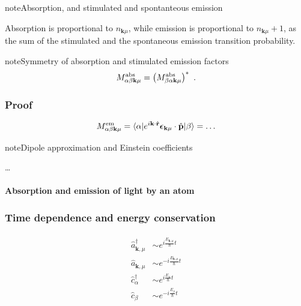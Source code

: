 \documentclass[letterpaper,10pt,english]{jupyterBook}
\begin{document}
\begin{sphinxadmonition}{note}{Absorption, and stimulated and spontanteous emission}

\sphinxAtStartPar
Absorption is proportional to \(n_{\mathbf{k} \mu}\), while emission is proportional to \(n_{\mathbf{k} \mu} + 1\), as the sum of the stimulated and the spontaneous emission transition probability.
\end{sphinxadmonition}

\begin{sphinxadmonition}{note}{Symmetry of absorption and stimulated emission factors}
\begin{equation*}
\begin{split}M^{\rm abs}_{\alpha \beta \mathbf{k} \mu} = \left( M^{\rm abs}_{\beta \alpha \mathbf{k} \mu} \right)^* \ .\end{split}
\end{equation*}\subsubsection*{Proof}
\begin{equation*}
\begin{split}M^{\rm em }_{\alpha \beta \mathbf{k} \mu} = \langle \alpha | e^{i \mathbf{k} \cdot \hat{\mathbf{r}}} \boldsymbol\epsilon_{\mathbf{k}\mu} \cdot \hat{\mathbf{p}} | \beta \rangle = \dots\end{split}
\end{equation*}\end{sphinxadmonition}

\begin{sphinxadmonition}{note}{Dipole approximation and Einstein coefficients}

\sphinxAtStartPar
…
\end{sphinxadmonition}


\paragraph{Absorption and emission of light by an atom}
\label{\detokenize{ch/quantum-mechanics/qft/interactions-e-em-fields-atom-spectrum:absorption-and-emission-of-light-by-an-atom}}\subsubsection*{Time dependence and energy conservation}
\begin{equation*}
\begin{split}\begin{aligned}
 \hat{a}_{\mathbf{k}, \mu}^\dagger & \sim e^{ i \frac{E_{\mathbf{k},\mu}}{\hbar} t} \\
 \hat{a}_{\mathbf{k}, \mu}         & \sim e^{-i \frac{E_{\mathbf{k},\mu}}{\hbar} t} \\
 \hat{c}_\alpha^\dagger            & \sim e^{ i \frac{E_\alpha}{\hbar} t} \\
 \hat{c}_\beta                     & \sim e^{-i \frac{E_\beta }{\hbar} t} \\
\end{aligned}\end{split}
\end{equation*}
\end{document}
